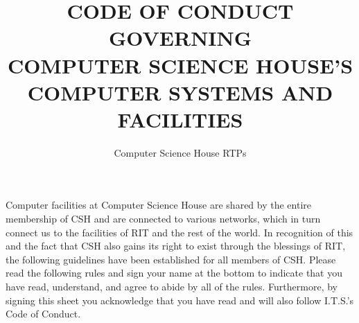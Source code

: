 \documentclass{article}
\title{
CODE OF CONDUCT GOVERNING\\
\textbf{COMPUTER SCIENCE HOUSE'S}\\
COMPUTER SYSTEMS AND FACILITIES}
\author{Computer Science House RTPs}
\date{\datechanged}
\begin{document}
\maketitle

Computer facilities at Computer Science House are shared by the entire
membership of CSH and are connected to various networks, which in turn connect
us to the facilities of RIT and the rest of the world. In recognition of this
and the fact that CSH also gains its right to exist through the blessings of
RIT, the following guidelines have been established for all members of CSH.
Please read the following rules and sign your name at the bottom to indicate
that you have read, understand, and agree to abide by all of the rules.
Furthermore, by signing this sheet you acknowledge that you have read and will
also follow I.T.S.'s Code of Conduct.
\end{document}
